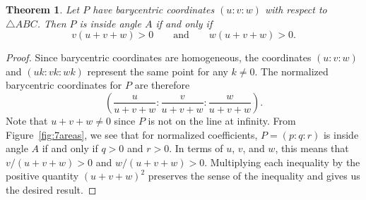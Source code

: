 \documentclass[10pt,a4paper]{amsart}
\newtheorem{theorem}{Theorem}
\begin{document}
\begin{theorem}
Let $P$ have barycentric coordinates $(u:v:w)$ with respect to $\triangle ABC$.
Then $P$ is inside angle $A$ if and only if
$$v(u+v+w)>0\qquad\textrm{and}\qquad w(u+v+w)>0.$$
\end{theorem}

\begin{proof}
Since barycentric coordinates are homogeneous, the coordinates $(u:v:w)$ and $(uk:vk:wk)$
represent the same point for any $k\neq 0$.
The normalized barycentric coordinates for $P$ are therefore
$$\left(\frac{u}{u+v+w}:\frac{v}{u+v+w}:\frac{w}{u+v+w}\right).$$
Note that $u+v+w\neq 0$ since $P$ is not on the line at infinity.
From Figure~\ref{fig:7areas}, we see that for normalized coefficients, $P=(p:q:r)$ is inside angle $A$
if and only if $q>0$ and $r>0$.
In terms of $u$, $v$, and $w$, this means that
$v/(u+v+w)>0$ and $w/(u+v+w)>0$.
Multiplying each inequality by the positive quantity $(u+v+w)^2$ preserves
the sense of the inequality and gives us the desired result.
\end{proof}
\end{document}

